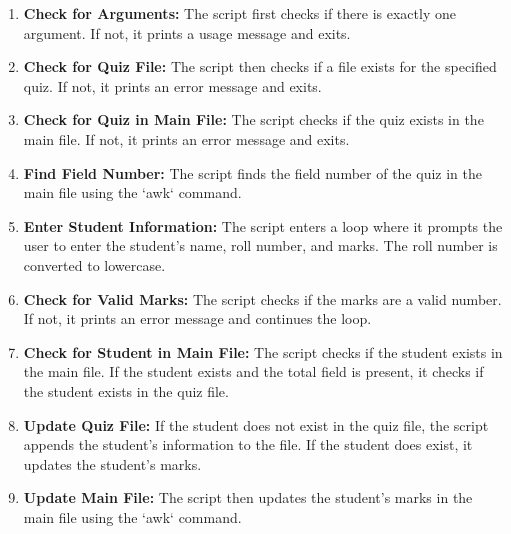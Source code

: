 \documentclass{article}
\begin{document}
\begin{enumerate}
    \item \textbf{Check for Arguments:} The script first checks if there is exactly one argument. If not, it prints a usage message and exits.
    
    \item \textbf{Check for Quiz File:} The script then checks if a file exists for the specified quiz. If not, it prints an error message and exits.
    
    \item \textbf{Check for Quiz in Main File:} The script checks if the quiz exists in the main file. If not, it prints an error message and exits.
    
    \item \textbf{Find Field Number:} The script finds the field number of the quiz in the main file using the `awk` command.
    
    \item \textbf{Enter Student Information:} The script enters a loop where it prompts the user to enter the student's name, roll number, and marks. The roll number is converted to lowercase.
    
    \item \textbf{Check for Valid Marks:} The script checks if the marks are a valid number. If not, it prints an error message and continues the loop.
    
    \item \textbf{Check for Student in Main File:} The script checks if the student exists in the main file. If the student exists and the total field is present, it checks if the student exists in the quiz file.
    
    \item \textbf{Update Quiz File:} If the student does not exist in the quiz file, the script appends the student's information to the file. If the student does exist, it updates the student's marks.
    
    \item \textbf{Update Main File:} The script then updates the student's marks in the main file using the `awk` command.
\end{enumerate}
\end{document}
